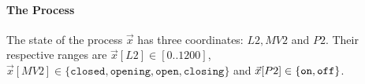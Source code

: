 {{%

\paragraph{The Process} 
The state of the process $\vec{x}$ has three coordinates: $L2, MV2$ and $P2$. Their respective ranges are $\vec{x}[L2]\in [0..1200]$, $\vec{x}[MV2]\in \{\texttt{closed},\texttt{opening},\texttt{open},\texttt{closing}\}$ and $\vec{x}[P2]\in \left\{\texttt{on},\texttt{off}\right\}$. 

}}
